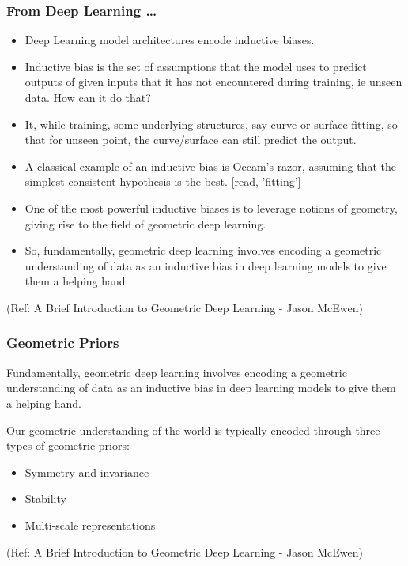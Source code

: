 \begin{frame}[fragile]\frametitle{From Deep Learning \ldots}


\begin{itemize}
\item Deep Learning model architectures encode inductive biases.
\item Inductive bias is the set of assumptions that the model uses to predict outputs of given inputs that it has not encountered during training, ie unseen data. How can it do that? 
\item It, while training, some underlying structures, say curve or surface fitting, so that for unseen point, the curve/surface can still predict the output. 
\item A classical example of an inductive bias is Occam's razor, assuming that the simplest consistent hypothesis  is the best. [read, 'fitting']
\item One of the most powerful inductive biases is to leverage notions of geometry, giving rise to the field of geometric deep learning.
\item So, fundamentally, geometric deep learning involves encoding a geometric understanding of data as an inductive bias in deep learning models to give them a helping hand.
\end{itemize}
	  
{\tiny (Ref: A Brief Introduction to Geometric Deep Learning - Jason McEwen)}

\end{frame}

\begin{frame}[fragile]\frametitle{Geometric Priors}

\begin{block}[]
Fundamentally, geometric deep learning involves encoding a geometric understanding of data as an inductive bias in deep learning models to give them a helping hand.
\end{block}

Our geometric understanding of the world is typically encoded through three types of geometric priors:

	\begin{itemize}
	\item Symmetry and invariance
	\item Stability
	\item Multi-scale representations
	\end{itemize}

{\tiny (Ref: A Brief Introduction to Geometric Deep Learning - Jason McEwen)}

\end{frame}

